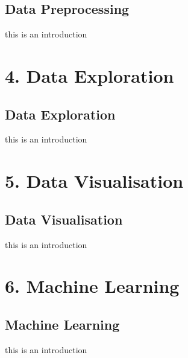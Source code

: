 \documentclass[letterpaper,10pt,english]{jupyterBook}
\begin{document}
\chapter{Data Preprocessing}
\label{\detokenize{c3_data_preprocessing/introduction:data-preprocessing}}\label{\detokenize{c3_data_preprocessing/introduction::doc}}
\sphinxAtStartPar
this is an introduction


\part{4. Data Exploration}


\chapter{Data Exploration}
\label{\detokenize{c4_data_exploration/introduction:data-exploration}}\label{\detokenize{c4_data_exploration/introduction::doc}}
\sphinxAtStartPar
this is an introduction


\part{5. Data Visualisation}


\chapter{Data Visualisation}
\label{\detokenize{c5_data_visualisation/introduction:data-visualisation}}\label{\detokenize{c5_data_visualisation/introduction::doc}}
\sphinxAtStartPar
this is an introduction


\part{6. Machine Learning}


\chapter{Machine Learning}
\label{\detokenize{c6_machine_learning/introduction:machine-learning}}\label{\detokenize{c6_machine_learning/introduction::doc}}
\sphinxAtStartPar
this is an introduction







\renewcommand{\indexname}{Index}
\printindex
\end{document}
